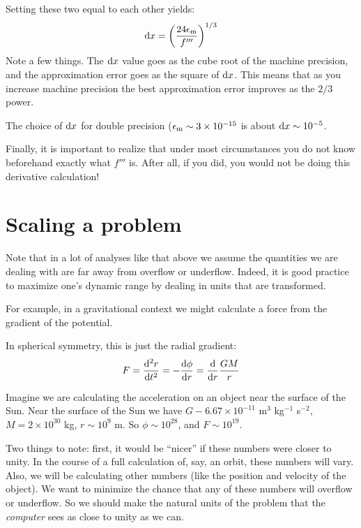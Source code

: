 Setting these two equal to each other yields:
\begin{equation}
{\rm d}x = \left(\frac{24 \epsilon_{\rm m}}{f'''}\right)^{1/3}
\end{equation}
Note a few things. The ${\rm d}x$ value goes as the cube root of the
machine precision, and the approximation error goes as the square of
${\rm d}x$. This means that as you increase machine precision the best
approximation error improves as the $2/3$ power.

The choice of ${\rm d}x$ for double precision ($\epsilon_{\rm m} \sim
3\times 10^{-15}$ is about ${\rm d}x \sim 10^{-5}$.

Finally, it is important to realize that under most circumstances you
do not know beforehand exactly what $f'''$ is. After all, if you did,
you would not be doing this derivative calculation!

\section{Scaling a problem}

Note that in a lot of analyses like that above we assume the
quantities we are dealing with are far away from overflow or
underflow. Indeed, it is good practice to maximize one's dynamic range
by dealing in units that are transformed. 

For example, in a gravitational context we might calculate a force
from the gradient of the potential.


\begin{answer}
In spherical symmetry, this is
just the radial gradient:
\begin{equation}
F = \frac{{\rm d}^2r}{{\rm d}t^2} = - \frac{{\rm d}\phi}{{\rm d}r} =
\frac{{\rm d}}{{\rm d}r} \frac{GM}{r}
\end{equation}
\end{answer}

Imagine we are calculating the acceleration on an object near the
surface of the Sun.  Near the surface of the Sun we have $G - 6.67
\times 10^{-11}$ m$^3$ kg$^{-1}$ s$^{-2}$, $M= 2\times 10^{30}$ kg, $r
\sim 10^9$ m. So $\phi \sim 10^{28}$, and $F\sim 10^{19}$.

Two things to note: first, it would be ``nicer'' if these numbers were
closer to unity. In the course of a full calculation of, say, an
orbit, these numbers will vary. Also, we will be calculating other
numbers (like the position and velocity of the object). We want to
minimize the chance that any of these numbers will overflow or
underflow. So we should make the natural units of the problem that the
{\it computer} sees as close to unity as we can.

